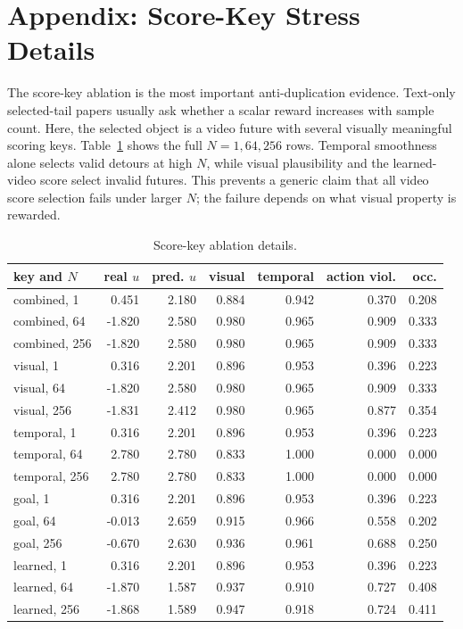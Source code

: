 \documentclass{article}
\begin{document}
\section{Appendix: Score-Key Stress Details}
\label{app:scorekey-details}

The score-key ablation is the most important anti-duplication evidence. Text-only selected-tail papers usually ask whether a scalar reward increases with sample count. Here, the selected object is a video future with several visually meaningful scoring keys. Table~\ref{tab:scorekey-full} shows the full \(N=1,64,256\) rows. Temporal smoothness alone selects valid detours at high \(N\), while visual plausibility and the learned-video score select invalid futures. This prevents a generic claim that all video score selection fails under larger \(N\); the failure depends on what visual property is rewarded.

\begin{table}[tbp]
  \centering
  \small
  \caption{Score-key ablation details.}
  \label{tab:scorekey-full}
  \begin{tabular}{@{}lrrrrrr@{}}
    \toprule
    key and \(N\) & real \(u\) & pred. \(u\) & visual & temporal & action viol. & occ. \\
    \midrule
    combined, 1 & 0.451 & 2.180 & 0.884 & 0.942 & 0.370 & 0.208 \\
    combined, 64 & -1.820 & 2.580 & 0.980 & 0.965 & 0.909 & 0.333 \\
    combined, 256 & -1.820 & 2.580 & 0.980 & 0.965 & 0.909 & 0.333 \\
    visual, 1 & 0.316 & 2.201 & 0.896 & 0.953 & 0.396 & 0.223 \\
    visual, 64 & -1.820 & 2.580 & 0.980 & 0.965 & 0.909 & 0.333 \\
    visual, 256 & -1.831 & 2.412 & 0.980 & 0.965 & 0.877 & 0.354 \\
    temporal, 1 & 0.316 & 2.201 & 0.896 & 0.953 & 0.396 & 0.223 \\
    temporal, 64 & 2.780 & 2.780 & 0.833 & 1.000 & 0.000 & 0.000 \\
    temporal, 256 & 2.780 & 2.780 & 0.833 & 1.000 & 0.000 & 0.000 \\
    goal, 1 & 0.316 & 2.201 & 0.896 & 0.953 & 0.396 & 0.223 \\
    goal, 64 & -0.013 & 2.659 & 0.915 & 0.966 & 0.558 & 0.202 \\
    goal, 256 & -0.670 & 2.630 & 0.936 & 0.961 & 0.688 & 0.250 \\
    learned, 1 & 0.316 & 2.201 & 0.896 & 0.953 & 0.396 & 0.223 \\
    learned, 64 & -1.870 & 1.587 & 0.937 & 0.910 & 0.727 & 0.408 \\
    learned, 256 & -1.868 & 1.589 & 0.947 & 0.918 & 0.724 & 0.411 \\
    \bottomrule
  \end{tabular}
\end{table}
\end{document}
